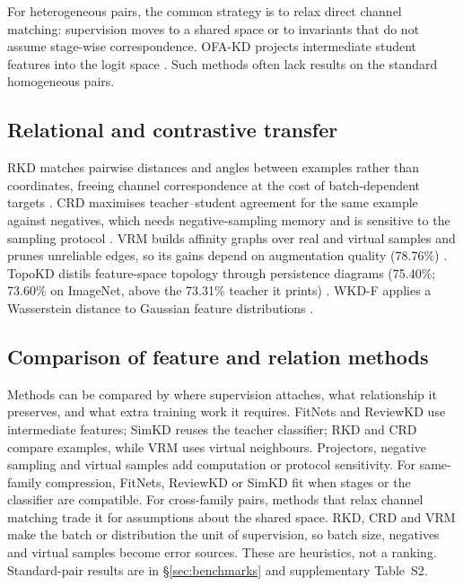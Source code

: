 For heterogeneous pairs, the common strategy is to relax direct channel matching: supervision moves to a shared space or to invariants that do not assume stage-wise correspondence. OFA-KD projects intermediate student features into the logit space \citep{hao2023ofakd}. Such methods often lack results on the standard homogeneous pairs.

\subsection{Relational and contrastive transfer}

RKD matches pairwise distances and angles between examples rather than coordinates, freeing channel correspondence at the cost of batch-dependent targets \citep{park2019rkd}. CRD maximises teacher--student agreement for the same example against negatives, which needs negative-sampling memory and is sensitive to the sampling protocol \citep{tian2020crd}. VRM builds affinity graphs over real and virtual samples and prunes unreliable edges, so its gains depend on augmentation quality (78.76\%) \citep{zhang2025vrm}. TopoKD distils feature-space topology through persistence diagrams (75.40\%; 73.60\% on ImageNet, above the 73.31\% teacher it prints) \citep{kim2024topkd}. WKD-F applies a Wasserstein distance to Gaussian feature distributions \citep{lv2024wkd}.

\subsection{Comparison of feature and relation methods}

Methods can be compared by where supervision attaches, what relationship it preserves, and what extra training work it requires. FitNets and ReviewKD use intermediate features; SimKD reuses the teacher classifier; RKD and CRD compare examples, while VRM uses virtual neighbours. Projectors, negative sampling and virtual samples add computation or protocol sensitivity. For same-family compression, FitNets, ReviewKD or SimKD fit when stages or the classifier are compatible. For cross-family pairs, methods that relax channel matching trade it for assumptions about the shared space. RKD, CRD and VRM make the batch or distribution the unit of supervision, so batch size, negatives and virtual samples become error sources. These are heuristics, not a ranking. Standard-pair results are in \S\ref{sec:benchmarks} and supplementary Table~S2.



